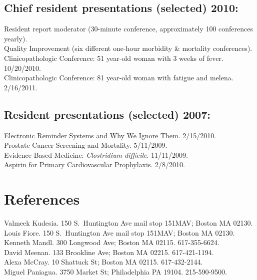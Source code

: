 \documentclass[12pt]{article}
\begin{document}
\subsection*{Chief resident presentations (selected) 2010:}
Resident report moderator (30-minute conference, approximately 100
conferences yearly).\\
Quality Improvement (six different one-hour morbidity \& mortality
conferences).\\
Clinicopathologic Conference: 51 year-old woman with 3 weeks of fever.
10/20/2010.\\
Clinicopathologic Conference: 81 year-old woman with fatigue and
melena. 2/16/2011.

\subsection*{Resident presentations (selected) 2007:}
Electronic Reminder Systems and Why We Ignore Them. 2/15/2010.\\
Prostate Cancer Screening and Mortality. 5/11/2009.\\
Evidence-Based Medicine: \emph{Clostridium difficile}. 11/11/2009.\\
Aspirin for Primary Cardiovascular Prophylaxis. 2/8/2010.

\section*{References}
Valmeek Kudesia. 150 S.\ Huntington Ave mail stop 151MAV; Boston MA
02130.\\
Louis Fiore. 150 S.\ Huntington Ave mail stop 151MAV; Boston MA
02130.\\
Kenneth Mandl. 300 Longwood Ave; Boston MA 02115. 617-355-6624.\\
David Meenan. 133 Brookline Ave; Boston MA 02215. 617-421-1194.\\
Alexa McCray. 10 Shattuck St; Boston MA 02115. 617-432-2144.\\
Miguel Paniagua. 3750 Market St; Philadelphia PA 19104. 215-590-9500.
\end{document}
